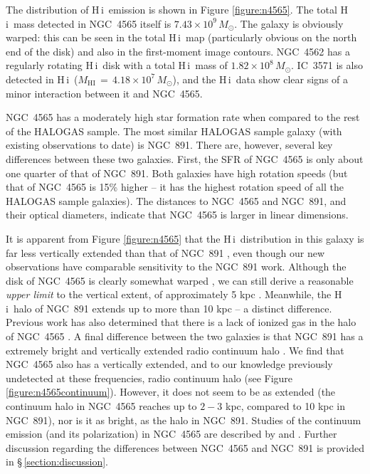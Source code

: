 \documentclass[oldversion]{aa}
\newcommand{\HI}{{\sc H\,i}}
\begin{document}
The distribution of \HI\ emission is shown in Figure \ref{figure:n4565}. The total \HI\ mass detected in NGC~4565 itself is $7.43\times10^9\,M_{\odot}$. The galaxy is obviously warped: this can be seen in the total \HI\ map (particularly obvious on the north end of the disk) and also in the first-moment image contours. NGC~4562 has a regularly rotating \HI\ disk with a total \HI\ mass of $1.82\times10^8\,M_{\odot}$. IC~3571 is also detected in \HI\ ($M_{\mathrm{HI}}\,=\,4.18\times10^7\,M_{\odot}$), and the \HI\ data show clear signs of a minor interaction between it and NGC~4565.

NGC~4565 has a moderately high star formation rate when compared to the rest of the HALOGAS sample. The most similar HALOGAS sample galaxy (with existing observations to date) is NGC~891. There are, however, several key differences between these two galaxies. First, the SFR of NGC~4565 is only about one quarter of that of NGC~891. Both galaxies have high rotation speeds (but that of NGC~4565 is 15\% higher -- it has the highest rotation speed of all the HALOGAS sample galaxies). The distances to NGC~4565 and NGC~891, and their optical diameters, indicate that NGC~4565 is larger in linear dimensions.

It is apparent from Figure \ref{figure:n4565} that the \HI\ distribution in this galaxy is far less vertically extended than that of NGC~891 \citep[compare with Figure 1 of][]{oosterloo_etal_2007}, even though our new observations have comparable sensitivity to the NGC~891 work. Although the disk of NGC~4565 is clearly somewhat warped \citep[and importantly, also partially along the line of sight;][]{rupen_1991}, we can still derive a reasonable {\it upper limit} to the vertical extent, of approximately 5 kpc \citep[using $\mathrm{PA}\,=\,315^\circ$;][]{dahlem_etal_2005}. Meanwhile, the \HI\ halo of NGC~891 extends up to more than 10 kpc -- a distinct difference. Previous work has also determined that there is a lack of ionized gas in the halo of NGC~4565 \citep[see][]{rand_etal_1992}. A final difference between the two galaxies is that NGC~891 has a extremely bright and vertically extended radio continuum halo \citep[e.g.,][]{dahlem_etal_1994}. We find that NGC~4565 also has a vertically extended, and to our knowledge previously undetected at these frequencies, radio continuum halo (see Figure \ref{figure:n4565continuum}). However, it does not seem to be as extended (the continuum halo in NGC~4565 reaches up to $2-3$ kpc, compared to 10 kpc in NGC~891), nor is it as bright, as the halo in NGC~891. Studies of the continuum emission (and its polarization) in NGC~4565 are described by \citet{hummel_etal_1984} and \citet{sukumar_allen_1991}. Further discussion regarding the differences between NGC~4565 and NGC~891 is provided in \S\,\ref{section:discussion}.
\end{document}
